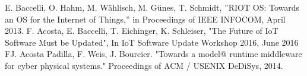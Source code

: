 \documentclass[a4paper, twoside]{article}
\begin{document}
\begin{thebibliography}{1}
	 E. Baccelli, O. Hahm, M. W{\"a}hlisch, M. G{\"u}nes, T. Schmidt, ''RIOT OS: Towards an OS for the Internet of Things,'' in Proceedings of IEEE INFOCOM, April 2013.
	 F. Acosta, E. Baccelli, T. Eichinger, K. Schleiser, "The Future of IoT Software Must be Updated", In IoT Software Update Workshop 2016, June 2016
	FJ. Acosta Padilla, F. Weis, J. Bourcier. "Towards a model@ runtime middleware for cyber physical systems." Proceedings of ACM / USENIX DeDiSys, 2014.

\end{thebibliography}
\end{document}
